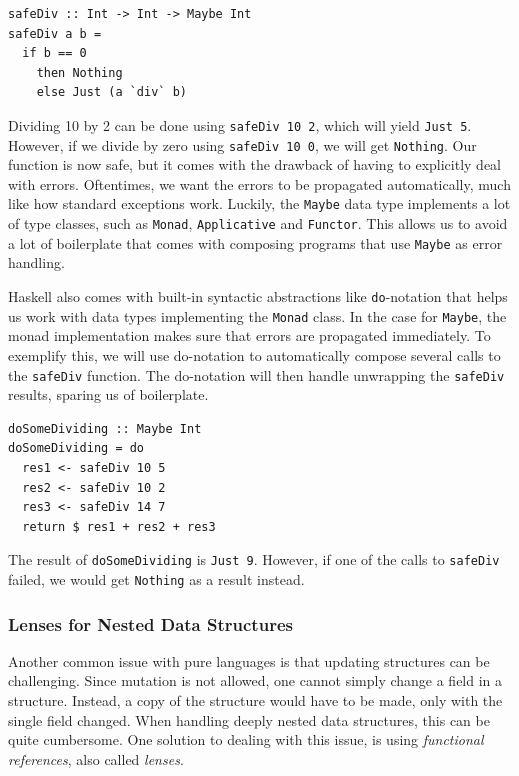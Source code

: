 \documentclass[a4paper,english]{ifimaster}
\begin{document}
\begin{verbatim}
safeDiv :: Int -> Int -> Maybe Int
safeDiv a b =
  if b == 0
    then Nothing
    else Just (a `div` b)
\end{verbatim}

Dividing 10 by 2 can be done using \texttt{safeDiv 10 2}, which will yield \texttt{Just 5}. However, if we divide by zero using \texttt{safeDiv 10 0}, we will get \texttt{Nothing}. Our function is now safe, but it comes with the drawback of having to explicitly deal with errors. Oftentimes, we want the errors to be propagated automatically, much like how standard exceptions work. Luckily, the \texttt{Maybe} data type implements a lot of type classes, such as \texttt{Monad}, \texttt{Applicative} and \texttt{Functor}. This allows us to avoid a lot of boilerplate that comes with composing programs that use \texttt{Maybe} as error handling.

Haskell also comes with built-in syntactic abstractions like \texttt{do}-notation that helps us work with data types implementing the \texttt{Monad} class. In the case for \texttt{Maybe}, the monad implementation makes sure that errors are propagated immediately. To exemplify this, we will use do-notation to automatically compose several calls to the \texttt{safeDiv} function. The do-notation will then handle unwrapping the \texttt{safeDiv} results, sparing us of boilerplate.

\begin{verbatim}
doSomeDividing :: Maybe Int
doSomeDividing = do
  res1 <- safeDiv 10 5
  res2 <- safeDiv 10 2
  res3 <- safeDiv 14 7
  return $ res1 + res2 + res3
\end{verbatim}

The result of \texttt{doSomeDividing} is \texttt{Just 9}. However, if one of the calls to \texttt{safeDiv} failed, we would get \texttt{Nothing} as a result instead.

\subsubsection{Lenses for Nested Data Structures}%
\label{ssub:optics_for_nested_data_structures}

Another common issue with pure languages is that updating structures can be challenging. Since mutation is not allowed, one cannot simply change a field in a structure. Instead, a copy of the structure would have to be made, only with the single field changed. When handling deeply nested data structures, this can be quite cumbersome. One solution to dealing with this issue, is using \textit{functional references}, also called \textit{lenses}.
\end{document}
